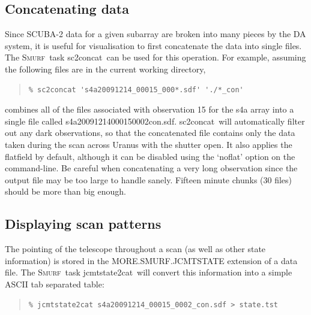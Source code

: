 \documentclass[twoside,11pt]{article}
\newcommand{\xref}[3]{#1}
\newcommand{\xlabel}[1]{}
\renewcommand{\_}{\texttt{\symbol{95}}}
\newenvironment{myquote}{\begin{quote}\begin{small}}{\end{small}\end{quote}}
\newcommand{\smurf}{\xref{\textsc{Smurf}}{sun258}{}}
\newcommand{\task}[1]{\textsf{#1}}
\newcommand{\concat}{\xref{\task{sc2concat}}{sun258}{SC2CONCAT}}
\newcommand{\jcmtstate}{\xref{\task{jcmtstate2cat}}{sun258}{JCMTSTATE2CAT}}
\begin{document}
\subsection{\xlabel{concat}Concatenating data}

Since SCUBA-2 data for a given subarray are broken into many pieces by
the DA system, it is useful for visualisation to first concatenate the
data into single files. The \smurf\ task \concat\ can be used for this
operation. For example, assuming the following files are in the
current working directory,

\begin{myquote}
\begin{verbatim}
% sc2concat 's4a20091214_00015_000*.sdf' './*_con'
\end{verbatim}
\end{myquote}

combines all of the files associated with observation 15 for the s4a
array into a single file called
s4a20091214\_00015\_0002\_con.sdf. \concat\ will automatically filter
out any dark observations, so that the concatenated file contains only
the data taken during the scan across Uranus with the shutter open. It
also applies the flatfield by default, although it can be disabled using
the `noflat' option on the command-line. Be careful when concatenating
a very long observation since the output file may be too large to
handle sanely. Fifteen minute chunks (30 files) should be more than
big enough.

\subsection{\xlabel{display_scan}Displaying scan patterns}

The pointing of the telescope throughout a scan (as well as other
state information) is stored in the MORE.SMURF.JCMTSTATE extension of
a data file. The \smurf\ task \jcmtstate\ will convert this
information into a simple ASCII tab separated table:

\begin{myquote}
\begin{verbatim}
% jcmtstate2cat s4a20091214_00015_0002_con.sdf > state.tst
\end{verbatim}
\end{myquote}
\end{document}
